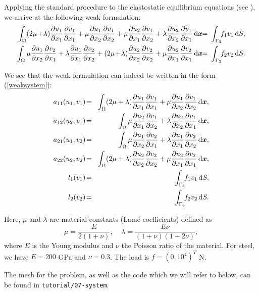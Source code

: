 \documentclass[11pt]{article}
\newcommand{\bfx}{\mbox{\boldmath $x$}}
\newcommand{\dd}[2]{\frac{\partial #1}{\partial #2}}
\begin{document}
Applying the standard procedure to the elastostatic equilibrium equations
(see \cite{lifshitz}), we arrive at the following weak formulation:
\begin{eqnarray*}
  \int_\Omega
    (2\mu\!+\!\lambda)\dd{u_1}{x_1}\dd{v_1}{x_1} + \mu\dd{u_1}{x_2}\dd{v_1}{x_2} +
    \mu\dd{u_2}{x_1}\dd{v_1}{x_2} + \lambda\dd{u_2}{x_2}\dd{v_1}{x_1}
    \,\mbox{d}\bfx \!\!&=&\!\!\!
    \int_{\Gamma_3} \!\!f_1 v_1 \,\mbox{d}S, \\ \smallskip
  \int_\Omega
    \mu\dd{u_1}{x_2}\dd{v_2}{x_1} + \lambda\dd{u_1}{x_1}\dd{v_2}{x_2} +
    (2\mu\!+\!\lambda)\dd{u_2}{x_2}\dd{v_2}{x_2} + \mu\dd{u_2}{x_1}\dd{v_2}{x_1}
    \,\mbox{d}\bfx \!\!&=&\!\!\!
    \int_{\Gamma_3} \!\!f_2 v_2 \,\mbox{d}S.
\end{eqnarray*}

We see that the weak formulation can indeed be written in the form (\ref{weaksystem}):
\begin{eqnarray}
  a_{11}(u_1, v_1) \!&=&\! \int_\Omega (2\mu+\lambda)\dd{u_1}{x_1}\dd{v_1}{x_1} + \mu\dd{u_1}{x_2}\dd{v_1}{x_2} \,\mbox{d}\bfx, \label{sysform1} \\
  a_{12}(u_2, v_1) \!&=&\! \int_\Omega \mu\dd{u_2}{x_1}\dd{v_1}{x_2} + \lambda\dd{u_2}{x_2}\dd{v_1}{x_1} \,\mbox{d}\bfx,\\
  a_{21}(u_1, v_2) \!&=&\! \int_\Omega \mu\dd{u_1}{x_2}\dd{v_2}{x_1} + \lambda\dd{u_1}{x_1}\dd{v_2}{x_2} \,\mbox{d}\bfx,\\
  a_{22}(u_2, v_2) \!&=&\! \int_\Omega (2\mu+\lambda)\dd{u_2}{x_2}\dd{v_2}{x_2} + \mu\dd{u_2}{x_1}\dd{v_2}{x_1} \,\mbox{d}\bfx, \label{sysform2} \\
  l_{1}(v_1) \!&=&\!
  \int_{\Gamma_3} \!\!f_1 v_1 \,\mbox{d}S, \\
  l_{2}(v_2) \!&=&\!
  \int_{\Gamma_3} \!\!f_2 v_2 \,\mbox{d}S.  \label{sysform3}
\end{eqnarray}

Here, $\mu$ and $\lambda$ are material constants (Lam\'e coefficients) defined as
$$\mu = \frac{E}{2(1+\nu)}, \ \ \ \ \  \lambda = \frac{E\nu}{(1+\nu)(1-2\nu)},$$
where $E$ is the Young modulus and $\nu$ the Poisson ratio of the material. For
steel, we have $E = 200$ GPa and $\nu = 0.3$. The load is $f = (0, 10^4)^T$ N.

The mesh for the problem, as well as the code which we will refer to below,
can be found in \verb"tutorial/07-system".
\end{document}

